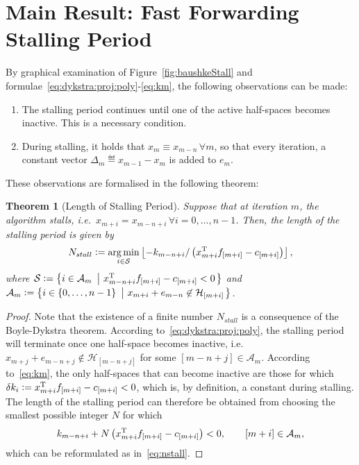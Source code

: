 \documentclass[hidelinks]{article}
\newtheorem{theorem}{Theorem}
\begin{document}
\section{Main Result: Fast Forwarding Stalling Period}

By graphical examination of Figure~\ref{fig:baushkeStall} and formulae~\eqref{eq:dykstra:proj:poly}-\eqref{eq:km}, the following observations can be made:
\begin{enumerate}
\item The stalling period continues until one of the active half-spaces becomes inactive. This is a necessary condition.
\item During stalling, it holds that $x_m\equiv x_{m-n}\,\forall m$, so that every iteration, a constant vector $\Delta_m\eqdef x_{m-1}-x_m$ is added to $e_m$.
\end{enumerate}

These observations are formalised in the following theorem:
\begin{theorem}[Length of Stalling Period]\label{thm:nstall}
Suppose that at iteration $m$, the algorithm stalls, i.e.\ $x_{m+i}=x_{m-n+i}\,\forall i=0,\dots,n-1$. Then, the length of the stalling period is given by
\begin{align}\label{eq:nstall}
N_{stall}\vcentcolon=\operatorname*{arg\,min}_{i\in\mathcal{S}} \left\lfloor -k_{m-n+i} / \left(x_{m+i}^{\text{T}} f_{[m+i]} - c_{[m+i]}\right)\right\rfloor,
\end{align}
where $\mathcal{S}\vcentcolon=\left\{ i\in \mathcal{A}_m\ \left| \ x_{m-n+i}^{\text{T}} f_{[m+i]} - c_{[m+i]} < 0 \right. \right\}$ and $\mathcal{A}_m\vcentcolon=\left\{ i\in\lbrace 0,\dots,n-1\rbrace\ \left| \ x_{m+i}+e_{m-n}\not\in\mathcal{H}_{[m+i]} \right. \right\}$.
\end{theorem}
\begin{proof}
Note that the existence of a finite number $N_{stall}$ is a consequence of the Boyle-Dykstra theorem. According to~\eqref{eq:dykstra:proj:poly}, the stalling period will terminate once one half-space becomes inactive, i.e. $x_{m+j}+e_{m-n+j}\not\in\mathcal{H}_{[m-n+j]}$ for some $[m-n+j]\in\mathcal{A}_m$. According to~\eqref{eq:km}, the only half-spaces that can become inactive are those for which $\delta k_{i} \vcentcolon= x_{m+i}^{\text{T}} f_{[m+i]} - c_{[m+i]} < 0$, which is, by definition, a constant during stalling. The length of the stalling period can therefore be obtained from choosing the smallest possible integer $N$ for which
\begin{align*}
k_{m-n+i}+N\left(x_{m+i}^{\text{T}} f_{[m+i]} - c_{[m+i]}\right) < 0,\qquad [m+i]\in\mathcal{A}_m,
\end{align*}
which can be reformulated as in~\eqref{eq:nstall}.
\end{proof}
\end{document}
